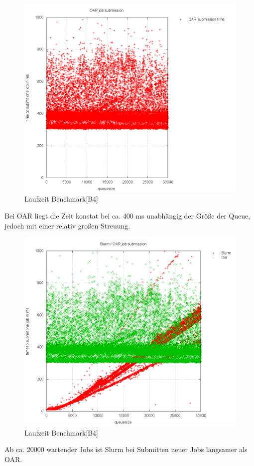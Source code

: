 	\begin{figure}[H]
		\centering
		\includegraphics[scale=0.8]{../oar/output/pics/oar.png} 
		\caption{Laufzeit Benchmark[B4]}
	\end{figure}
    Bei OAR liegt die Zeit konstat bei ca. 400 ms unabhängig der Größe
    der Queue, jedoch mit einer relativ großen Streuung.
    \newpage 

	\begin{figure}[H]
		\centering
		\includegraphics[scale=0.75]{../oar/output/pics/oar_slurm.png} 
		\caption{Laufzeit Benchmark[B4]}
	\end{figure}
    Ab ca. 20000 wartender Jobs ist Slurm bei Submitten neuer Jobs langsamer als 
    OAR. 
    \newpage 

